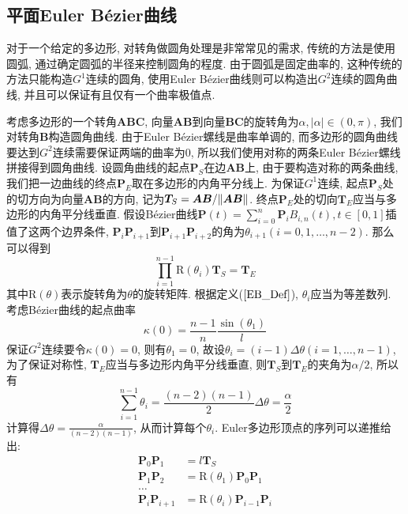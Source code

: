 \documentclass[utf8]{ctexart} %
\begin{document}
		\subsection{平面Euler B\'{e}zier曲线}
		对于一个给定的多边形, 对转角做圆角处理是非常常见的需求, 传统的方法是使用圆弧, 通过确定圆弧的半径来控制圆角的程度. 由于圆弧是固定曲率的, 这种传统的方法只能构造$G^1$连续的圆角, 使用Euler B\'{e}zier曲线则可以构造出$G^2$连续的圆角曲线, 并且可以保证有且仅有一个曲率极值点.\par
		考虑多边形的一个转角$\boldsymbol{ABC}$, 向量$\boldsymbol{AB}$到向量$\boldsymbol{BC}$的旋转角为$\alpha, |\alpha|\in(0,\pi)$, 我们对转角$\boldsymbol{B}$构造圆角曲线. 由于Euler B\'{e}zier螺线是曲率单调的, 而多边形的圆角曲线要达到$G^2$连续需要保证两端的曲率为0, 所以我们使用对称的两条Euler B\'{e}zier螺线拼接得到圆角曲线. 设圆角曲线的起点$\boldsymbol{P}_S$在边$\boldsymbol{AB}$上, 由于要构造对称的两条曲线, 我们把一边曲线的终点$\boldsymbol{P}_E$取在多边形的内角平分线上. 为保证$G^1$连续, 起点$\boldsymbol{P}_S$处的切方向为向量$\boldsymbol{AB}$的方向, 记为$\boldsymbol{T}_S = \boldsymbol{AB}/\Arrowvert\boldsymbol{AB}\Arrowvert$. 终点$\boldsymbol{P}_E$处的切向$\boldsymbol{T}_E$应当与多边形的内角平分线垂直. 假设B\'ezier曲线$\boldsymbol{P}(t)=\sum_{i=0}^n\boldsymbol{P}_iB_{i,n}(t),t\in[0,1]$插值了这两个边界条件, $\boldsymbol{P}_i\boldsymbol{P}_{i+1}$到$\boldsymbol{P}_{i+1}\boldsymbol{P}_{i+2}$的角为$\theta_{i+1}(i=0,1,\dots,n-2)$. 那么可以得到
		\begin{equation}
			\prod_{i=1}^{n-1}\text{R}(\theta_i)\boldsymbol{T}_S =  \boldsymbol{T}_E
		\end{equation}
		其中$\text{R}(\theta)$表示旋转角为$\theta$的旋转矩阵. 根据定义($\ref{EB_Def}$), $\theta_i$应当为等差数列. 考虑B\'ezier曲线的起点曲率$$\kappa(0)=\frac{n-1}{n}\frac{\sin(\theta_1)}{l}$$
		保证$G^2$连续要令$\kappa(0)=0$, 则有$\theta_1=0$, 故设$\theta_i=(i-1)\Delta\theta(i=1,\dots,n-1)$, 为了保证对称性, $\boldsymbol{T}_E$应当与多边形内角平分线垂直, 则$\boldsymbol{T}_S$到$\boldsymbol{T}_E$的夹角为$\alpha/2$, 所以有
		\begin{equation}
			\sum_{i=1}^{n-1}\theta_i = \frac{(n-2)(n-1)}2\Delta\theta = \frac{\alpha}2
		\end{equation}
		计算得$\Delta\theta=\frac{\alpha}{(n-2)(n-1)}$, 从而计算每个$\theta_i$. Euler多边形顶点的序列可以递推给出:
		\begin{equation}\label{recur}
			\begin{aligned}
				\boldsymbol{P}_0\boldsymbol{P}_1 &=l\boldsymbol{T}_S\\
				\boldsymbol{P}_1\boldsymbol{P}_2 &=\text{R}(\theta_1)\boldsymbol{P}_0\boldsymbol{P}_1\\
				\dots\\
				\boldsymbol{P}_i\boldsymbol{P}_{i+1} &=\text{R}(\theta_i)\boldsymbol{P}_{i-1}\boldsymbol{P}_i
			\end{aligned}
		\end{equation}
\end{document}
